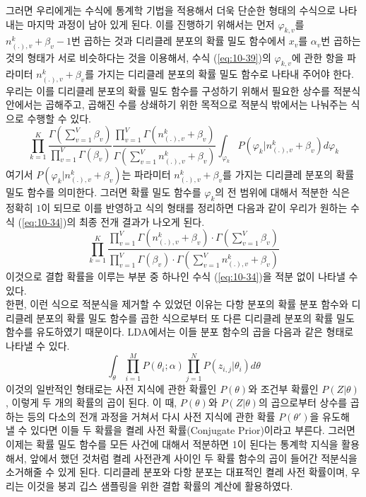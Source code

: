 \documentclass[a4paper]{oblivoir}
\begin{document}
그러면 우리에게는 수식에 통계학 기법을 적용해서 더욱 단순한 형태의 수식으로 나타내는 마지막 과정이 남아 있게 된다. 이를 진행하기 위해서는 먼저 $\varphi_{k,v}$를 $n_{(.),v}^{k}+\beta_{v}-1$번 곱하는 것과 디리클레 분포의 확률 밀도 함수에서 $x_{v}$를 $\alpha_{v}$번 곱하는 것의 형태가 서로 비슷하다는 것을 이용해서, 수식 (\ref{eq:10-39})의 $\varphi_{k,v}$에 관한 항을 파라미터 $n_{(.),v}^{k}+\beta_{v}$를 가지는 디리클레 분포의 확률 밀도 함수로 나타내 주어야 한다. 우리는 이를 디리클레 분포의 확률 밀도 함수를 구성하기 위해서 필요한 상수를 적분식 안에서는 곱해주고, 곱해진 수를 상쇄하기 위한 목적으로 적분식 밖에서는 나눠주는 식으로 수행할 수 있다. 
\begin{equation}
\prod_{k=1}^{K} \frac{\Gamma(\sum_{v=1}^{V} \beta_{v})}{\prod_{v=1}^{V} \Gamma(\beta_{v})} \frac{\prod_{v=1}^{V} \Gamma(n_{(.),v}^{k}+\beta_{v})}{\Gamma(\sum_{v=1}^{V} n_{(.),v}^{k}+\beta_{v})} \int_{\varphi_{k}}    P(\varphi_{k}|n_{(.),v}^{k}+\beta_{v}) d\varphi_{k}
\label{eq:10-40}
\end{equation}
여기서 $P(\varphi_{k}|n_{(.),v}^{k}+\beta_{v})$는 파라미터 $n_{(.),v}^{k}+\beta_{v}$를 가지는 디리클레 분포의 확률 밀도 함수를 의미한다. 그러면 확률 밀도 함수를 $\varphi_{k}$의 전 범위에 대해서 적분한 식은 정확히 $1$이 되므로 이를 반영하고 식의 형태를 정리하면 다음과 같이 우리가 원하는 수식 (\ref{eq:10-34})의 최종 전개 결과가 나오게 된다.
\begin{equation}
\prod_{k=1}^{K} \frac{\prod_{v=1}^{V} \Gamma(n_{(.),v}^{k}+\beta_{v}) \cdot \Gamma(\sum_{v=1}^{V} \beta_{v})}{\prod_{v=1}^{V} \Gamma(\beta_{v}) \cdot \Gamma(\sum_{v=1}^{V} n_{(.),v}^{k}+\beta_{v})}
\label{eq:10-41}
\end{equation}
이것으로 결합 확률을 이루는 부분 중 하나인 수식 (\ref{eq:10-34})을 적분 없이 나타낼 수 있다. \\

한편, 이런 식으로 적분식을 제거할 수 있었던 이유는 다항 분포의 확률 분포 함수와 디리클레 분포의 확률 밀도 함수를 곱한 식으로부터 또 다른 디리클레 분포의 확률 밀도 함수를 유도하였기 때문이다. LDA에서는 이들 분포 함수의 곱을 다음과 같은 형태로 나타낼 수 있다.    
\begin{equation}
\int_{\theta} \prod_{i=1}^{M} P(\theta_{i} ; \alpha) \prod_{j=1}^{N} P(z_{i,j}|\theta_{i}) d\theta
\label{eq:10-41-1}
\end{equation}
이것의 일반적인 형태로는 사전 지식에 관한 확률인 $P(\theta)$와 조건부 확률인 $P(Z|\theta)$, 이렇게 두 개의 확률의 곱이 된다. 이 때, $P(\theta)$와 $P(Z|\theta)$의 곱으로부터 상수를 곱하는 등의 다소의 전개 과정을 거쳐서 다시 사전 지식에 관한 확률 $P(\theta')$을 유도해 낼 수 있다면 이들 두 확률을 켤레 사전 확률(Conjugate Prior)이라고 부른다. 그러면 이제는 확률 밀도 함수를 모든 사건에 대해서 적분하면 1이 된다는 통계학 지식을 활용해서, 앞에서 했던 것처럼 켤레 사전관계 사이인 두 확률 함수의 곱이 들어간 적분식을 소거해줄 수 있게 된다.      디리클레 분포와 다항 분포는 대표적인 켤레 사전 확률이며, 우리는 이것을 붕괴 깁스 샘플링을 위한 결합 확률의 계산에 활용하였다. \\
 
\end{document}
